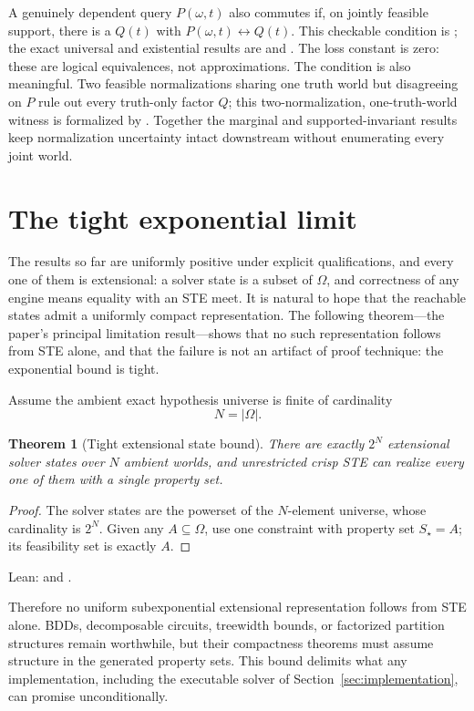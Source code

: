 \documentclass[11pt]{article}
\newtheorem{theorem}{Theorem}[section]
\theoremstyle{definition}
\theoremstyle{remark}
\newcommand{\Hyp}{\Omega}
\begin{document}
A genuinely dependent query $P(\omega,t)$ also commutes if, on jointly
feasible support, there is a $Q(t)$ with $P(\omega,t)\leftrightarrow Q(t)$.
This checkable condition is ; the exact universal and
existential results are  and
.  The loss constant is zero: these are
logical equivalences, not approximations.  The condition is also meaningful.
Two feasible normalizations sharing one truth world but disagreeing on $P$
rule out every truth-only factor $Q$; this two-normalization, one-truth-world
witness is formalized by .
Together the marginal and supported-invariant results keep normalization
uncertainty intact downstream without enumerating every joint world.

\section{The tight exponential limit}\label{sec:limit}

The results so far are uniformly positive under explicit qualifications, and
every one of them is extensional: a solver state is a subset of $\Hyp$, and
correctness of any engine means equality with an STE meet.  It is natural to
hope that the reachable states admit a uniformly compact representation.  The
following theorem---the paper's principal limitation result---shows that no
such representation follows from STE alone, and that the failure is not an
artifact of proof technique: the exponential bound is tight.

Assume the ambient exact hypothesis universe is finite of cardinality
\[
  N=|\Hyp|.
\]

\begin{theorem}[Tight extensional state bound]
There are exactly $2^N$ extensional solver states over $N$ ambient worlds, and
unrestricted crisp STE can realize every one of them with a single property
set.
\end{theorem}
\begin{proof}
The solver states are the powerset of the $N$-element universe, whose
cardinality is $2^N$.  Given any $A\subseteq\Hyp$, use one constraint with
property set $S_\star=A$; its feasibility set is exactly $A$.
\end{proof}
\noindent Lean:  and
.

Therefore no uniform subexponential extensional representation follows from
STE alone.  BDDs, decomposable circuits, treewidth bounds, or factorized
partition structures remain worthwhile, but their compactness theorems must
assume structure in the generated property sets.  This bound delimits what any
implementation, including the executable solver of
Section~\ref{sec:implementation}, can promise unconditionally.
\end{document}
